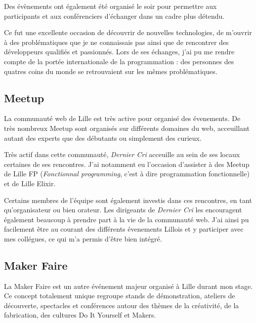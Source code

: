 \bigskip

Des évènements ont également été organisé le soir pour permettre aux
participants et aux conférenciers d'échanger dans un cadre plus détendu.

\bigskip

Ce fut une excellente occasion de découvrir de nouvelles technologies,
de m'ouvrir à des problématiques que je ne connaissais pas ainsi que de
rencontrer des développeurs qualifiés et passionnés. Lors de ses
échanges, j'ai pu me rendre compte de la portée internationale de la
programmation : des personnes des quatres coins du monde se retrouvaient
sur les mêmes problématiques.

\bigskip

\subsection{Meetup}\label{meetup}

\bigskip

La communauté web de Lille est très active pour organisé des évenements.
De très nombreux Meetup sont organisés sur différents domaines du web,
acceuillant autant des experts que des débutants ou simplement des
curieux.

\bigskip

Très actif dans cette communauté, \emph{Dernier Cri} acceuille au sein
de ses locaux certaines de ses rencontres. J'ai notamment eu l'occasion
d'assister à des Meetup de Lille FP (\emph{Fonctionnal programming},
c'est à dire programmation fonctionnelle) et de Lille Elixir.

\bigskip

Certains membres de l'équipe sont également investis dans ces
rencontres, en tant qu'organisateur ou bien orateur. Les dirigeants de
\emph{Dernier Cri} les encouragent également beaucoup à prendre part à
la vie de la communauté web. J'ai ainsi pu facilement être au courant
des différents évenements Lillois et y participer avec mes collégues, ce
qui m'a permis d'être bien intégré.

\bigskip

\subsection{Maker Faire}\label{maker-faire}

\bigskip

La Maker Faire est un autre événement majeur organisé à Lille durant mon
stage. Ce concept totalement unique regroupe stands de démonstration,
ateliers de découverte, spectacles et conférences autour des thèmes de
la créativité, de la fabrication, des cultures Do It Yourself et Makers.

